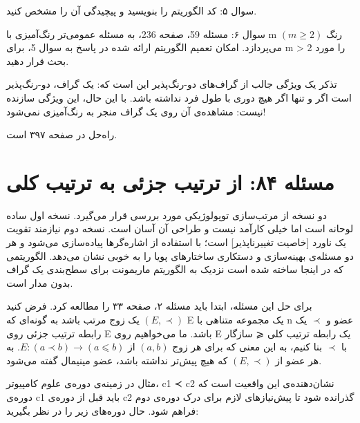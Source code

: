 \documentclass{book} %
\begin{document}
سوال ۵: کد الگوریتم را بنویسید و پیچیدگی آن را مشخص کنید.

سوال ۶: مسئله 59، صفحه 236، به مسئله عمومی‌تر رنگ‌آمیزی با m رنگ $(m ≥ 2)$ می‌پردازد.
امکان تعمیم الگوریتم ارائه شده در پاسخ به سوال 5، برای m > 2 را مورد بحث قرار دهید.

تذکر
یک ویژگی جالب از گراف‌های دو-رنگ‌پذیر این است که: یک گراف، دو-رنگ‌پذیر است اگر و تنها اگر هیچ دوری با طول فرد نداشته باشد. با این حال، این ویژگی سازنده نیست: مشاهده‌ی آن روی یک گراف منجر به رنگ‌آمیزی نمی‌شود!

راه‌حل در صفحه ۳۹۷ است.

\newpage

\section {مسئله ۸۴: از ترتیب جزئی به ترتیب کلی}

دو نسخه از مرتب‌سازی توپولوژیکی مورد بررسی قرار می‌گیرد. نسخه اول ساده لوحانه است
اما خیلی کارآمد نیست و طراحی آن آسان است. نسخه دوم نیازمند تقویت یک ناورد [خاصیت
تغییرناپذیر] است؛ با استفاده از اشاره‌گرها پیاده‌سازی می‌شود و هر دو مسئله‌ی بهینه‌سازی و
دستکاری ساختارهای پویا را به خوبی نشان می‌دهد. الگوریتمی که در اینجا ساخته شده است
نزدیک به الگوریتم ماریمونت برای سطح‌بندی یک گراف بدون مدار است.

برای حل این مسئله، ابتدا باید مسئله ۲، صفحه ۳۳ را مطالعه کرد.
فرض کنید $(E, \prec)$ یک زوج مرتب باشد به گونه‌ای که E یک مجموعه متناهی با n عضو
و $\prec$ یک رابطه ترتیب جزئی روی E باشد. ما می‌خواهیم روی E یک رابطه ترتیب کلی
⩽ سازگار با $\prec$ بنا کنیم، به این معنی که برای هر زوج $(a, b)$ از $E: (a \prec b) \rightarrow (a ⩽ b)$.
به هر عضو از $(E, \prec)$ که هیچ پیش‌تر نداشته باشد، عضو مینیمال گفته می‌شود.


مثال
در زمینه‌ی دوره‌ی علوم کامپیوتر، c1 ≺ c2 نشان‌دهنده‌ی این واقعیت است که دوره‌ی c1 باید
قبل از دوره‌ی c2 گذرانده شود تا پیش‌نیازهای لازم برای درک دوره‌ی دوم فراهم شود.
حال دوره‌های زیر را در نظر بگیرید:


\end{document}
